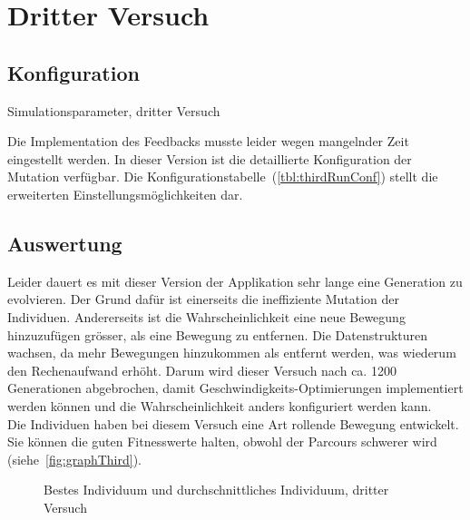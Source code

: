   \section{Dritter Versuch}

    \subsection{Konfiguration}

      \begin{table}[H]
        \centering
        
        \caption{Simulationsparameter, dritter Versuch\label{tbl:thirdRunConf}}
      \end{table}

      Die Implementation des Feedbacks musste leider wegen mangelnder Zeit eingestellt werden.
      In dieser Version ist die detaillierte Konfiguration der Mutation verfügbar.
      Die Konfigurationstabelle~(\vref{tbl:thirdRunConf}) stellt die erweiterten Einstellungsmöglichkeiten dar.

    \subsection{Auswertung\label{sub:thirdAuswertung}}

      Leider dauert es mit dieser Version der Applikation sehr lange eine Generation zu evolvieren.
      Der Grund dafür ist einerseits die ineffiziente Mutation der Individuen.
      Andererseits ist die Wahrscheinlichkeit eine neue Bewegung hinzuzufügen grösser, als eine Bewegung zu entfernen.
      Die Datenstrukturen wachsen, da mehr Bewegungen hinzukommen als entfernt werden,
      was wiederum den Rechenaufwand erhöht.
      Darum wird dieser Versuch nach ca. 1200 Generationen abgebrochen,
      damit Geschwindigkeits-Optimierungen implementiert werden können und die Wahrscheinlichkeit anders konfiguriert werden kann.
      \\
      Die Individuen haben bei diesem Versuch eine Art rollende Bewegung entwickelt.
      Sie können die guten Fitnesswerte halten,
      obwohl der Parcours schwerer wird (siehe~\vref{fig:graphThird}).

      \begin{figure}[H]
        \centering
        
        \caption{Bestes Individuum und durchschnittliches Individuum, dritter Versuch\label{fig:graphThird}}
      \end{figure}

